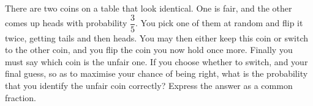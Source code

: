 There are two coins on a table that look identical. One is fair, and the other comes up heads with probability $\dfrac35$. You pick one of them at random and flip it twice, getting tails and then heads. You may then either keep this coin or switch to the other coin, and you flip the coin you now hold once more. Finally you must say which coin is the unfair one. If you choose whether to switch, and your final guess, so as to maximise your chance of being right, what is the probability that you identify the unfair coin correctly? Express the answer as a common fraction.
